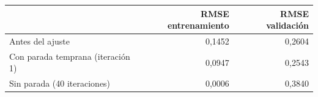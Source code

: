 \begin{tabular}{lrr}
\toprule
 & RMSE entrenamiento & RMSE validación \\
\midrule
Antes del ajuste & 0,1452 & 0,2604 \\
Con parada temprana (iteración 1) & 0,0947 & 0,2543 \\
Sin parada (40 iteraciones) & 0,0006 & 0,3840 \\
\bottomrule
\end{tabular}
